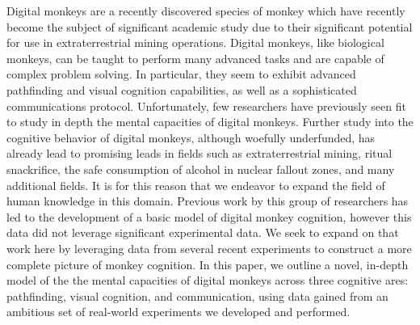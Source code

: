 Digital monkeys are a recently discovered species of monkey which have recently become the
subject of significant academic study due to their significant potential for use in
extraterrestrial mining operations.
Digital monkeys, like biological monkeys, can be taught to perform many advanced tasks and are
capable of complex problem solving.
In particular, they seem to exhibit advanced pathfinding and visual cognition capabilities, as well
as a sophisticated communications protocol.
Unfortunately, few researchers have previously seen fit to study in depth the mental capacities of
digital monkeys.
Further study into the cognitive behavior of digital monkeys, although woefully underfunded,
has already lead to promising leads in fields such as extraterrestrial mining, ritual snackrifice,
the safe consumption of alcohol in nuclear fallout zones\cite{teapot}, and many additional fields.
It is for this reason that we endeavor to expand the field of human knowledge in this domain.
Previous work by this group of researchers has led to the development of a basic model of digital
monkey cognition\cite{sub_verif_plan}, however this data did not leverage significant experimental
data.
We seek to expand on that work here by leveraging data from several recent experiments to
construct a more complete picture of monkey cognition.
In this paper, we outline a novel, in-depth model of the the mental capacities of digital monkeys
across three cognitive ares: pathfinding, visual cognition, and communication, using data gained
from an ambitious set of real-world experiments we developed and performed.